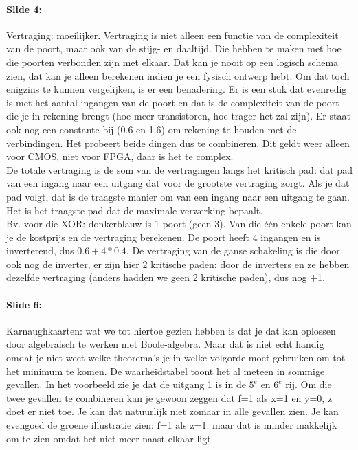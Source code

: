 \documentclass[10pt,a4paper]{book}
\begin{document}
\paragraph{Slide 4:} Vertraging: moeilijker. Vertraging is niet alleen een functie van de complexiteit van de poort, maar ook van de stijg- en daaltijd. Die hebben te maken met hoe die poorten verbonden zijn met elkaar. Dat kan je nooit op een logisch schema zien, dat kan je alleen berekenen indien je een fysisch ontwerp hebt. Om dat toch enigzins te kunnen vergelijken, is er een benadering. Er is een stuk dat evenredig is met het aantal ingangen van de poort en dat is de complexiteit van de poort die je in rekening brengt (hoe meer transistoren, hoe trager het zal zijn). Er staat ook nog een constante bij (0.6 en 1.6) om rekening te houden met de verbindingen. Het probeert beide dingen dus te combineren. Dit geldt weer alleen voor CMOS, niet voor FPGA, daar is het te complex.\\
De totale vertraging is de som van de vertragingen langs het kritisch pad: dat pad van een ingang naar een uitgang dat voor de grootste vertraging zorgt. Als je dat pad volgt, dat is de traagste manier om van een ingang naar een uitgang te gaan. Het is het traagste pad dat de maximale verwerking bepaalt.\\
Bv. voor die XOR: donkerblauw is 1 poort (geen 3). Van die \'e\'en enkele poort kan je de kostprijs en de vertraging berekenen. De poort heeft 4 ingangen en is inverterend, dus $0.6+4*0.4$. De vertraging van de ganse schakeling is die door ook nog de inverter, er zijn hier 2 kritische paden: door de inverters en ze hebben dezelfde vertraging (anders hadden we geen 2 kritische paden), dus nog +1.

\paragraph{Slide 6:} Karnaughkaarten: wat we tot hiertoe gezien hebben is dat je dat kan oplossen door algebraisch te werken met Boole-algebra. Maar dat is niet echt handig omdat je niet weet welke theorema's je in welke volgorde moet gebruiken om tot het minimum te komen. De waarheidstabel toont het al meteen in sommige gevallen. In het voorbeeld zie je dat de uitgang 1 is in de $5^e$ en $6^e$ rij. Om die twee gevallen te combineren kan je gewoon zeggen dat f=1 als x=1 en y=0, z doet er niet toe. Je kan dat natuurlijk niet zomaar in alle gevallen zien. Je kan evengoed de groene illustratie zien: f=1 als z=1. maar dat is minder makkelijk om te zien omdat het niet meer naast elkaar ligt. 
\end{document}
